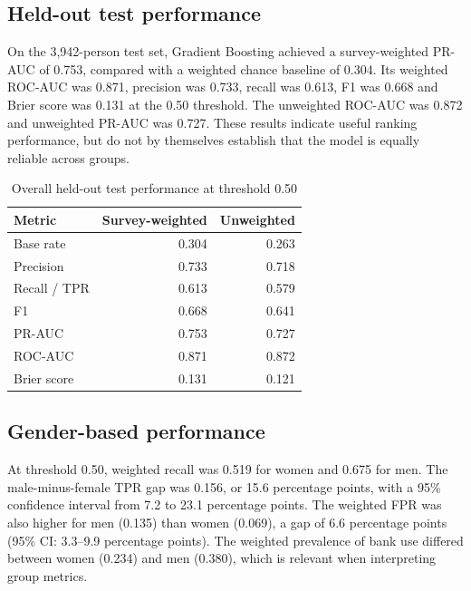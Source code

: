 \documentclass[11pt,a4paper]{article}
\begin{document}
\subsection{Held-out test performance}

On the 3,942-person test set, Gradient Boosting achieved a survey-weighted PR-AUC of 0.753, compared with a weighted chance baseline of 0.304. Its weighted ROC-AUC was 0.871, precision was 0.733, recall was 0.613, F1 was 0.668 and Brier score was 0.131 at the 0.50 threshold. The unweighted ROC-AUC was 0.872 and unweighted PR-AUC was 0.727. These results indicate useful ranking performance, but do not by themselves establish that the model is equally reliable across groups.

\begin{table}[H]
\centering
\caption{Overall held-out test performance at threshold 0.50}
\label{tab:test}
\begin{tabular}{lrr}
\toprule
Metric & Survey-weighted & Unweighted\\
\midrule
Base rate & 0.304 & 0.263\\
Precision & 0.733 & 0.718\\
Recall / TPR & 0.613 & 0.579\\
F1 & 0.668 & 0.641\\
PR-AUC & 0.753 & 0.727\\
ROC-AUC & 0.871 & 0.872\\
Brier score & 0.131 & 0.121\\
\bottomrule
\end{tabular}
\end{table}

\subsection{Gender-based performance}

At threshold 0.50, weighted recall was 0.519 for women and 0.675 for men. The male-minus-female TPR gap was 0.156, or 15.6 percentage points, with a 95\% confidence interval from 7.2 to 23.1 percentage points. The weighted FPR was also higher for men (0.135) than women (0.069), a gap of 6.6 percentage points (95\% CI: 3.3--9.9 percentage points). The weighted prevalence of bank use differed between women (0.234) and men (0.380), which is relevant when interpreting group metrics.
\end{document}
